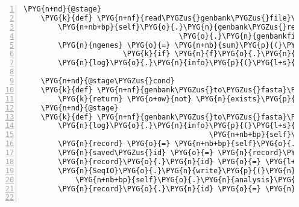 \begin{Verbatim}[commandchars=\\\{\},numbers=left,firstnumber=1,stepnumber=5]
    \PYG{n+nd}{@stage}
    \PYG{k}{def} \PYG{n+nf}{read\PYGZus{}genbank\PYGZus{}file}\PYG{p}{(}\PYG{n+nb+bp}{self}\PYG{p}{)}\PYG{p}{:}
        \PYG{n+nb+bp}{self}\PYG{o}{.}\PYG{n}{genbank\PYGZus{}record} \PYG{o}{=} \PYG{n}{SeqIO}\PYG{o}{.}\PYG{n}{parse}\PYG{p}{(}\PYG{n+nb}{open}\PYG{p}{(}\PYG{n+nb+bp}{self}\PYG{o}{.}\PYG{n}{analysis} \PYGZbs{}
                                    \PYG{o}{.}\PYG{n}{genbankfile\PYGZus{}path}\PYG{p}{)}\PYG{p}{,} \PYG{l+s}{"}\PYG{l+s}{genbank}\PYG{l+s}{"}\PYG{p}{)}\PYG{o}{.}\PYG{n}{next}\PYG{p}{(}\PYG{p}{)}
        \PYG{n}{ngenes} \PYG{o}{=} \PYG{n+nb}{sum}\PYG{p}{(}\PYG{l+m+mi}{1} \PYG{k}{for} \PYG{n}{f} \PYG{o+ow}{in} \PYG{n+nb+bp}{self}\PYG{o}{.}\PYG{n}{genbank\PYGZus{}record}\PYG{o}{.}\PYG{n}{features}
                       \PYG{k}{if} \PYG{n}{f}\PYG{o}{.}\PYG{n}{type} \PYG{o}{==} \PYG{l+s}{'}\PYG{l+s}{gene}\PYG{l+s}{'}\PYG{p}{)}
        \PYG{n}{log}\PYG{o}{.}\PYG{n}{info}\PYG{p}{(}\PYG{l+s}{"}\PYG{l+s}{genbank file lists }\PYG{l+s+si}{\PYGZpc{}d}\PYG{l+s}{ genes}\PYG{l+s}{"} \PYG{o}{\PYGZpc{}} \PYG{n}{ngenes}\PYG{p}{)}

    \PYG{n+nd}{@stage\PYGZus{}cond}
    \PYG{k}{def} \PYG{n+nf}{genbank\PYGZus{}to\PYGZus{}fasta}\PYG{p}{(}\PYG{n+nb+bp}{self}\PYG{p}{)}\PYG{p}{:}
        \PYG{k}{return} \PYG{o+ow}{not} \PYG{n}{exists}\PYG{p}{(}\PYG{n+nb+bp}{self}\PYG{o}{.}\PYG{n}{analysis}\PYG{o}{.}\PYG{n}{genbankfile\PYGZus{}fa\PYGZus{}path}\PYG{p}{)}
    \PYG{n+nd}{@stage}
    \PYG{k}{def} \PYG{n+nf}{genbank\PYGZus{}to\PYGZus{}fasta}\PYG{p}{(}\PYG{n+nb+bp}{self}\PYG{p}{)}\PYG{p}{:}
        \PYG{n}{log}\PYG{o}{.}\PYG{n}{info}\PYG{p}{(}\PYG{l+s}{"}\PYG{l+s}{Converting }\PYG{l+s}{'}\PYG{l+s+si}{\PYGZpc{}s}\PYG{l+s}{'}\PYG{l+s}{ to fasta format}\PYG{l+s}{"} \PYG{o}{\PYGZpc{}}
                                           \PYG{n+nb+bp}{self}\PYG{o}{.}\PYG{n}{analysis}\PYG{o}{.}\PYG{n}{genbankfile\PYGZus{}name}\PYG{p}{)}
        \PYG{n}{record} \PYG{o}{=} \PYG{n+nb+bp}{self}\PYG{o}{.}\PYG{n}{genbank\PYGZus{}record}
        \PYG{n}{saved\PYGZus{}id} \PYG{o}{=} \PYG{n}{record}\PYG{o}{.}\PYG{n}{id}
        \PYG{n}{record}\PYG{o}{.}\PYG{n}{id} \PYG{o}{=} \PYG{l+s}{"}\PYG{l+s}{chr}\PYG{l+s}{"} \PYG{c}{\PYGZsh{} make ucsc browser custom tracks work}
        \PYG{n}{SeqIO}\PYG{o}{.}\PYG{n}{write}\PYG{p}{(}\PYG{n}{record}\PYG{p}{,} \PYG{n+nb}{open}\PYG{p}{(}
            \PYG{n+nb+bp}{self}\PYG{o}{.}\PYG{n}{analysis}\PYG{o}{.}\PYG{n}{genbankfile\PYGZus{}fa\PYGZus{}path}\PYG{p}{,} \PYG{l+s}{"}\PYG{l+s}{w}\PYG{l+s}{"}\PYG{p}{)}\PYG{p}{,} \PYG{l+s}{"}\PYG{l+s}{fasta}\PYG{l+s}{"}\PYG{p}{)}
        \PYG{n}{record}\PYG{o}{.}\PYG{n}{id} \PYG{o}{=} \PYG{n}{saved\PYGZus{}id}


\end{Verbatim}
